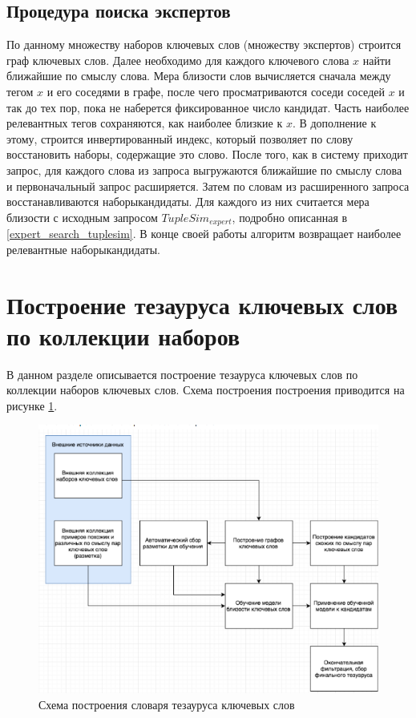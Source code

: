 \subsection{Процедура поиска экспертов}
По данному множеству наборов ключевых слов (множеству экспертов) строится граф ключевых слов. Далее необходимо для каждого ключевого слова $x$ найти ближайшие по смыслу слова. Мера близости слов вычисляется сначала между тегом $x$ и его соседями в графе, после чего просматриваются соседи соседей $x$ и так до тех пор, пока не наберется фиксированное число кандидат. Часть наиболее релевантных тегов сохраняются, как наиболее близкие к $x$. В дополнение к этому, строится инвертированный индекс, который позволяет по слову восстановить наборы, содержащие это слово. После того, как в систему приходит запрос, для каждого слова из запроса выгружаются ближайшие по смыслу слова и первоначальный запрос расширяется. Затем по словам из расширенного запроса восстанавливаются наборы­кандидаты. Для каждого из них считается мера близости с исходным запросом $TupleSim_{expert}$, подробно описанная в \ref{expert_search_tuplesim}. В конце своей работы алгоритм возвращает наиболее релевантные наборы­кандидаты.

\section{Построение тезауруса ключевых слов по коллекции наборов} \label{thes}

В данном разделе описывается построение тезауруса ключевых слов по коллекции наборов ключевых слов. Схема построения построения приводится на рисунке \ref{img:thes}.

\begin{figure}[ht]
  \begin{minipage}[ht]{1.0\linewidth}\centering
    \includegraphics[width=0.7\linewidth]{Dissertation/pics/thes}
    \caption{Схема построения словаря тезауруса ключевых слов}
    \label{img:thes}
  \end{minipage}
\end{figure}

